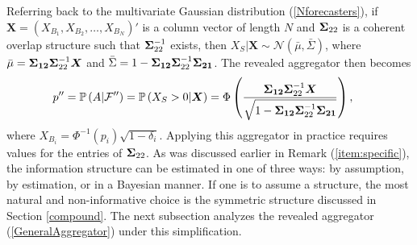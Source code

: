 \documentclass[12pt]{article}
\renewcommand{\P}{\mathbb{P}}
\theoremstyle{definition}
\theoremstyle{definition}
\def\one{\mathbbm{1}}
\def\F{{\cal F}}
\def\P{{\mathbb P}}
\def\probit{p_{\rm probit}}
\begin{document}
Referring back to the multivariate Gaussian distribution
(\ref{Nforecasters}), if $\boldsymbol{X} = (X_{B_1}, X_{B_2}, \dots,
X_{B_N})'$ is a column vector of length $N$ and ${\bf\Sigma}_{22}$ is a
coherent overlap structure such that ${\bf\Sigma}_{22}^{-1}$ exists, then $X_{S} | \boldsymbol{X} \sim \mathcal{N}\left(\bar{\mu}, \bar{\Sigma}\right)$, where $\bar{\mu} 
  = {\bf \Sigma_{12}} {\bf\Sigma}_{22}^{-1} \boldsymbol{X}$ and $\bar{\Sigma} = 1 - {\bf\Sigma_{12}} {\bf\Sigma}_{22}^{-1} {\bf\Sigma_{21}}$. 
%
The revealed aggregator then becomes
\begin{align}
p'' & =  \P\left(A  | \F''\right) =  \P\left(X_{S} > 0 | \boldsymbol{X}\right) = \Phi\left( \frac{{\bf\Sigma_{12}} {\bf\Sigma}_{22}^{-1} \boldsymbol{X}}
   {\sqrt{1 - {\bf\Sigma_{12}} {\bf\Sigma}_{22}^{-1} {\bf\Sigma_{21}}}}\right), 
\label{GeneralAggregator} \,
\end{align}
 where $X_{B_i} =
\Phi^{-1}(p_i)\sqrt{1-\delta_i}$. Applying this aggregator in practice requires values for the entries of ${\bf\Sigma}_{22}$.
As  was discussed earlier in Remark (\ref{item:specific}), the information structure can be estimated in one of three ways: by
assumption, by estimation, or in a Bayesian manner. If one is to
assume a structure, the most natural and non-informative choice is the
symmetric structure discussed in Section \ref{compound}. The next subsection analyzes the revealed aggregator (\ref{GeneralAggregator}) under this simplification.
\end{document}
